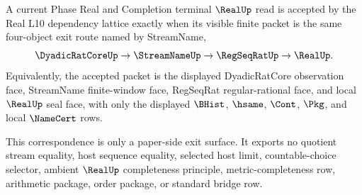 \begin{theorem}
\label{thm:real-l10-streamname-exit-route-correspondence}
A current Phase Real and Completion terminal $\RealUp$ read is accepted by the Real L10 dependency lattice exactly when its visible finite packet is the same four-object exit route named by StreamName,
$$
\DyadicRatCoreUp \to \StreamNameUp \to \RegSeqRatUp \to \RealUp.
$$
Equivalently, the accepted packet is the displayed DyadicRatCore observation face, StreamName finite-window face, RegSeqRat regular-rational face, and local $\RealUp$ seal face, with only the displayed $\BHist$, $\hsame$, $\Cont$, $\Pkg$, and local $\NameCert$ rows.

This correspondence is only a paper-side exit surface. It exports no quotient stream equality, host sequence equality, selected host limit, countable-choice selector, ambient $\RealUp$ completeness principle, metric-completeness row, arithmetic package, order package, or standard bridge row.
\end{theorem}

